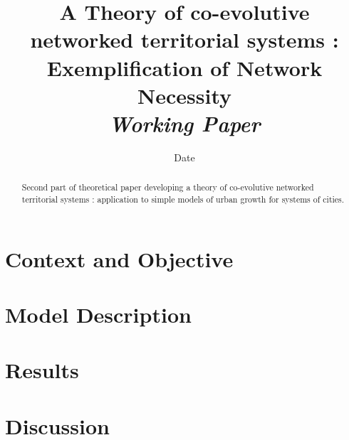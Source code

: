 


\title{A Theory of co-evolutive networked territorial systems : Exemplification of Network Necessity\bigskip\\
\textit{Working Paper}
}
\author{}
\date{Date}


\maketitle

\justify


\begin{abstract}
Second part of theoretical paper developing a theory of co-evolutive networked territorial systems : application to simple models of urban growth for systems of cities.
\end{abstract}



\section{Context and Objective}



\section{Model Description}



\section{Results}




\section{Discussion}












